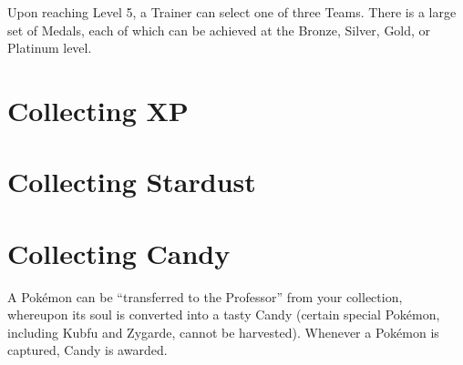 Upon reaching Level 5, a Trainer can select one of three Teams.
There is a large set of Medals, each of which can be achieved at the Bronze,
 Silver, Gold, or Platinum level.

\section{Collecting XP}

\section{Collecting Stardust}

\section{Collecting Candy}
A Pokémon can be ``transferred to the Professor'' from your collection,
 whereupon its soul is converted into a tasty Candy (certain special
 Pokémon, including Kubfu and Zygarde, cannot be harvested).
Whenever a Pokémon is captured, Candy is awarded.
